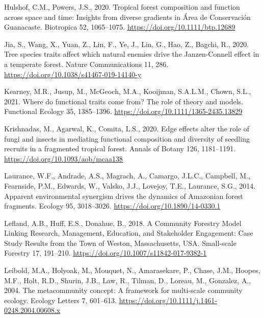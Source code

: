 \documentclass[
  12pt,
]{article}
\newlength{\cslhangindent}
\newlength{\cslentryspacingunit} %
\newenvironment{CSLReferences}[2] %
 {%
  \setlength{\parindent}{0pt}
  \ifodd #1
  \let\oldpar\par
  \def\par{\hangindent=\cslhangindent\oldpar}
  \fi
  \setlength{\parskip}{#2\cslentryspacingunit}
 }%
 {}
\begin{document}
\begin{CSLReferences}{1}{0}
\leavevmode{}%
Hulshof, C.M., Powers, J.S., 2020. Tropical forest composition and function across space and time: {Insights} from diverse gradients in {Área} de {Conservación Guanacaste}. Biotropica 52, 1065--1075. \url{https://doi.org/10.1111/btp.12689}

\leavevmode{}%
Jia, S., Wang, X., Yuan, Z., Lin, F., Ye, J., Lin, G., Hao, Z., Bagchi, R., 2020. Tree species traits affect which natural enemies drive the {Janzen-Connell} effect in a temperate forest. Nature Communications 11, 286. \url{https://doi.org/10.1038/s41467-019-14140-y}

\leavevmode{}%
Kearney, M.R., Jusup, M., McGeoch, M.A., Kooijman, S.A.L.M., Chown, S.L., 2021. Where do functional traits come from? {The} role of theory and models. Functional Ecology 35, 1385--1396. \url{https://doi.org/10.1111/1365-2435.13829}

\leavevmode{}%
Krishnadas, M., Agarwal, K., Comita, L.S., 2020. Edge effects alter the role of fungi and insects in mediating functional composition and diversity of seedling recruits in a fragmented tropical forest. Annals of Botany 126, 1181--1191. \url{https://doi.org/10.1093/aob/mcaa138}

\leavevmode{}%
Laurance, W.F., Andrade, A.S., Magrach, A., Camargo, J.L.C., Campbell, M., Fearnside, P.M., Edwards, W., Valsko, J.J., Lovejoy, T.E., Laurance, S.G., 2014. Apparent environmental synergism drives the dynamics of {Amazonian} forest fragments. Ecology 95, 3018--3026. \url{https://doi.org/10.1890/14-0330.1}

\leavevmode{}%
Lefland, A.B., Huff, E.S., Donahue, B., 2018. A {Community Forestry Model Linking Research}, {Management}, {Education}, and {Stakeholder Engagement}: {Case Study Results} from the {Town} of {Weston}, {Massachusetts}, {USA}. Small-scale Forestry 17, 191--210. \url{https://doi.org/10.1007/s11842-017-9382-1}

\leavevmode{}%
Leibold, M.A., Holyoak, M., Mouquet, N., Amarasekare, P., Chase, J.M., Hoopes, M.F., Holt, R.D., Shurin, J.B., Law, R., Tilman, D., Loreau, M., Gonzalez, A., 2004. The metacommunity concept: {A} framework for multi-scale community ecology. Ecology Letters 7, 601--613. \url{https://doi.org/10.1111/j.1461-0248.2004.00608.x}


\end{CSLReferences}
\end{document}
